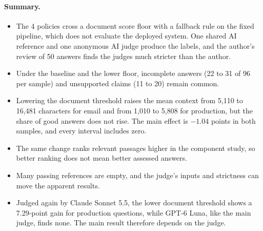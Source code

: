 \paragraph{Summary.}
\begin{itemize}
  \item The 4 policies cross a document score floor with a fallback rule on the fixed pipeline, which does not evaluate the deployed system. One shared AI reference and one anonymous AI judge produce the labels, and the author's review of 50 answers finds the judges much stricter than the author.
  \item Under the baseline and the lower floor, incomplete answers (22 to 31 of 96 per sample) and unsupported claims (11 to 20) remain common.
  \item Lowering the document threshold raises the mean context from 5,110 to 16,481 characters for email and from 1,010 to 5,808 for production, but the share of good answers does not rise. The main effect is $-1.04$ points in both samples, and every interval includes zero.
  \item The same change ranks relevant passages higher in the component study, so better ranking does not mean better assessed answers.
  \item Many passing references are empty, and the judge's inputs and strictness can move the apparent results.
  \item Judged again by Claude Sonnet 5.5, the lower document threshold shows a 7.29-point gain for production questions, while GPT-6 Luna, like the main judge, finds none. The main result therefore depends on the judge.
\end{itemize}
